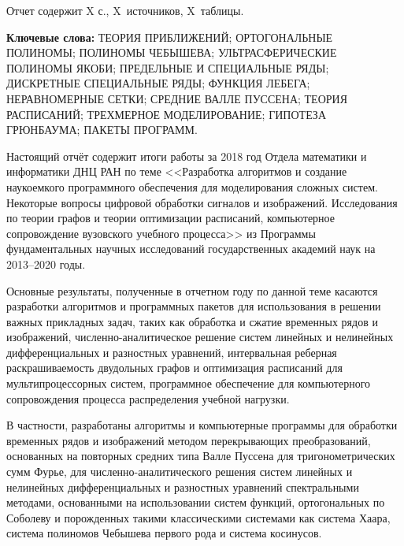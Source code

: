 \Referat %

Отчет содержит X с., X~источников, X~таблицы.

 \bigskip
 \textbf{ Ключевые
  слова:}
  ТЕОРИЯ ПРИБЛИЖЕНИЙ; ОРТОГОНАЛЬНЫЕ ПОЛИНОМЫ; ПОЛИНОМЫ ЧЕБЫШЕВА; УЛЬТРАСФЕРИЧЕСКИЕ ПОЛИНОМЫ ЯКОБИ; ПРЕДЕЛЬНЫЕ И СПЕЦИАЛЬНЫЕ РЯДЫ; ДИСКРЕТНЫЕ СПЕЦИАЛЬНЫЕ РЯДЫ; ФУНКЦИЯ ЛЕБЕГА; НЕРАВНОМЕРНЫЕ СЕТКИ; СРЕДНИЕ ВАЛЛЕ ПУССЕНА; ТЕОРИЯ РАСПИСАНИЙ; ТРЕХМЕРНОЕ МОДЕЛИРОВАНИЕ; ГИПОТЕЗА ГРЮНБАУМА; ПАКЕТЫ ПРОГРАММ.

 \bigskip

Настоящий отчёт содержит итоги работы за 2018 год Отдела математики и информатики ДНЦ РАН по теме
<<Разработка алгоритмов и создание наукоемкого программного обеспечения для моделирования сложных систем. Некоторые вопросы цифровой обработки сигналов и изображений. Исследования по теории графов и теории оптимизации расписаний, компьютерное сопровождение вузовского учебного процесса>>
из Программы фундаментальных научных исследований государственных академий наук на 2013–2020 годы.


















Основные результаты, полученные в отчетном году по данной теме касаются разработки алгоритмов и программных пакетов для использования в решении важных прикладных задач, таких как обработка и сжатие временных рядов и изображений, численно-аналитическое решение систем линейных и нелинейных дифференциальных и разностных уравнений, интервальная реберная раскрашиваемость двудольных графов и оптимизация расписаний для мультипроцессорных систем,  программное обеспечение для компьютерного сопровождения процесса распределения учебной нагрузки.


В частности, разработаны алгоритмы и компьютерные программы для обработки временных рядов и изображений методом перекрывающих преобразований, основанных на повторных средних типа Валле Пуссена для тригонометрических сумм Фурье, для численно-аналитического решения систем линейных и нелинейных дифференциальных и разностных уравнений спектральными методами, основанными на использовании систем функций, ортогональных по Соболеву и порожденных такими классическими системами как система Хаара, система полиномов Чебышева первого рода и система косинусов.






